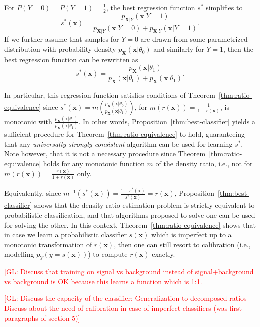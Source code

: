 \documentclass[12pt]{article}
\numberwithin{equation}{section}
\theoremstyle{plain}
\newcommand{\glnote}[1]{\textcolor{red}{[GL: #1]}}
\begin{document}
For $P(Y=0)=P(Y=1)=\frac{1}{2}$, the best regression function $s^*$ simplifies
to
\begin{equation}
s^*(\mathbf{x}) = \frac{p_{\mathbf{X}|Y}(\mathbf{x}|Y=1)}{p_{\mathbf{X}|Y}(\mathbf{x} | Y=0) + p_{\mathbf{X}|Y}(\mathbf{x} | Y=1)}.
\end{equation}
If we further assume that samples for $Y=0$ are drawn from some parametrized
distribution with probability density $p_{\mathbf{X}}(\mathbf{x}|\theta_0)$
and similarly for $Y=1$, then the best regression function can be rewritten
as
\begin{equation}
s^*(\mathbf{x}) = \frac{p_{\mathbf{X}}(\mathbf{x}|\theta_1)}{p_{\mathbf{X}}(\mathbf{x} | \theta_0) + p_{\mathbf{X}}(\mathbf{x} | \theta_1)}.
\end{equation}

In particular, this regression function satisfies conditions of
Theorem~\ref{thm:ratio-equivalence} since $s^*(\mathbf{x}) =
m(\frac{p_\mathbf{X}(\mathbf{x}|\theta_0)}{p_\mathbf{X}(\mathbf{x}|\theta_1)})$,
for $m(r(\mathbf{x})) = \frac{1}{1 + r(\mathbf{x})}$, is monotonic
with
$\frac{p_\mathbf{X}(\mathbf{x}|\theta_0)}{p_\mathbf{X}(\mathbf{x}|\theta_1)}$.
In other words, Proposition~\ref{thm:best-classifier} yields a sufficient
procedure for Theorem~\ref{thm:ratio-equivalence} to hold, guaranteeing that any {\it
universally strongly consistent} algorithm can be used for learning $s^*$.
Note however,
that it is not a necessary procedure since Theorem~\ref{thm:ratio-equivalence} holds
for any monotonic function $m$ of the density ratio, i.e., not for
$m(r(\mathbf{x})) = \frac{r(\mathbf{x})}{1 + r(\mathbf{x})}$ only.

Equivalently, since $m^{-1}(s^*(\mathbf{x})) = \frac{1 - s^*(\mathbf{x})}{s^*(\mathbf{x})} = r(\mathbf{x})$,
Proposition~\ref{thm:best-classifier} shows that the density ratio estimation problem is strictly
equivalent to probabilistic classification, and that algorithms proposed to
solve one can be used for solving the other. In this context, Theorem~\ref{thm:ratio-equivalence}
shows that in case we learn a probabilistic classifier $s(\mathbf{x})$
which is imperfect up to a monotonic transformation of $r(\mathbf{x})$, then
one can still resort to calibration (i.e., modelling $p_Y(y=s(\mathbf{x}))$)
to compute $r(\mathbf{x})$ exactly.

\glnote{Discuss that training on signal vs background instead of signal+background vs background is OK because this learns a function which is 1:1.}

\glnote{Discuss the capacity of the classifier; Generalization to decomposed ratios
Discuss about the need of calibration in case of imperfect classifiers (was first paragraphs of section 5)}
\end{document}
